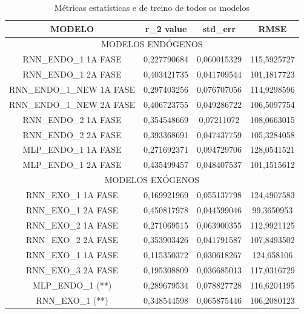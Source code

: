 	    
	    
	    
	    \begin{table}[!ht]
        \caption{Métricas estatísticas e de treino de todos os modelos}
        \begin{adjustbox}{width=0.8\columnwidth,center}
           \begin{tabular}{ |c | c| c | c| }
     \rowcolor{gray!50}
   {	MODELO} & r\_2 value &	std\_err & RMSE \\ \hline
     \multicolumn{4}{c}{	MODELOS ENDÓGENOS }  \\ \hline
RNN\_ENDO\_1 1A FASE&	0,227790684	&0,060015329&	115,5925727\\ \hline
RNN\_ENDO\_1 2A FASE&	0,403421735	&0,041709544&	101,1817723\\ \hline
RNN\_ENDO\_1\_NEW 1A FASE&	0,297403256&	0,076707056&	114,9298596\\ \hline
RNN\_ENDO\_1\_NEW 2A FASE&	0,406723755&	0,049286722&	106,5097754\\ \hline
RNN\_ENDO\_2 1A FASE&	0,354548669	&0,07211072&	108,0663015\\ \hline
RNN\_ENDO\_2 2A FASE&	0,393368691	&0,047437759&	105,3284058\\ \hline
MLP\_ENDO\_1 1A FASE&	0,271692371	&0,094729706&	128,0541521\\ \hline
MLP\_ENDO\_1 2A FASE&	0,435499457	&0,048407537&	101,1515612\\ \hline
	\multicolumn{4}{c}{ MODELOS EXÓGENOS }\\ \hline
RNN\_EXO\_1 1A FASE &	0,169921969	&0,055137798&	124,4907583\\ \hline
RNN\_EXO\_1 2A FASE	&0,450817978&	0,044599046	&99,3650953\\ \hline
RNN\_EXO\_2 1A FASE&	0,271069515&	0,063900355&	112,9921125\\ \hline
RNN\_EXO\_2 2A FASE&	0,353903426&	0,041791587	&107,8493502\\ \hline
RNN\_EXO\_1 1A FASE	&0,115350372&	0,030618267	&124,658106\\ \hline
RNN\_EXO\_3 2A FASE&	0,195308809	&0,036685013&	117,0316729\\ \hline
MLP\_ENDO\_1 (**)&	0,289679534	&0,078827728&	116,6204195\\ \hline
RNN\_EXO\_1  (**)&	0,348544598	&0,065875446&	106,2080123 \\ \hline
\end{tabular} \end{adjustbox} \end{table} 
	    

